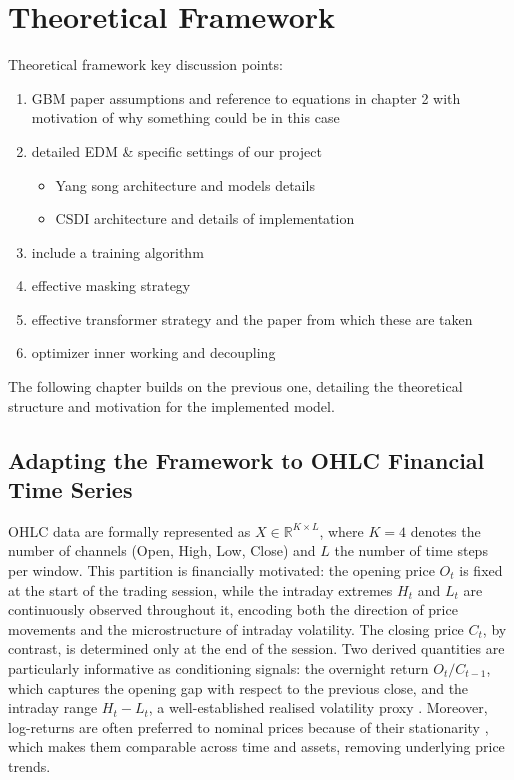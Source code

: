 \chapter{Theoretical Framework}
\label{ch:theoretical_framework}
Theoretical framework key discussion points:
\begin{enumerate}
    \item GBM paper assumptions and reference to equations in chapter 2 with motivation of why something could be in this case
    \item detailed EDM \& specific settings of our project
    \begin{itemize}
        \item Yang song architecture and models details
        \item CSDI architecture and details of implementation
    \end{itemize}
    \item include a training algorithm
    \item effective masking strategy
    \item effective transformer strategy and the paper from which these are taken
    \item optimizer inner working and decoupling
\end{enumerate}
The following chapter builds on the previous one, detailing the theoretical 
structure and motivation for the implemented model.

\section{Adapting the Framework to OHLC Financial Time Series}
\label{sec:ohlc_theoretical}

OHLC data are formally represented as \(X \in \mathbb{R}^{K \times L}\), 
where \(K = 4\) denotes the number of channels (Open, High, Low, Close) 
and \(L\) the number of time steps per window. This partition is 
financially motivated: the opening price \(O_t\) is fixed at the start of 
the trading session, while the intraday extremes \(H_t\) and \(L_t\) are 
continuously observed throughout it, encoding both the direction of price 
movements and the microstructure of intraday volatility. The closing price 
\(C_t\), by contrast, is determined only at the end of the session. Two 
derived quantities are particularly informative as conditioning signals: the 
overnight return \(O_t / C_{t-1}\), which captures the opening gap with 
respect to the previous close, and the intraday range \(H_t - L_t\), a 
well-established realised volatility proxy \cite{parkinson1980extreme}. Moreover, log-returns are often preferred to nominal prices because of their stationarity \cite{cont2001empirical}, which makes them comparable across time and assets, removing underlying price trends.

